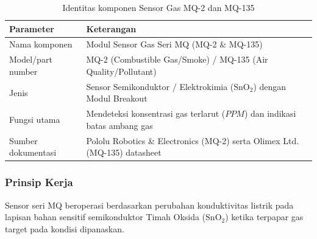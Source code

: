 \begin{table}[H]
	\centering
	\caption{Identitas komponen Sensor Gas MQ-2 dan MQ-135}
	\label{tab:mq_identitas}
	\small
	\begin{tabularx}{\textwidth}{@{}lX@{}}
		\toprule
		Parameter          & Keterangan                                                                 \\
		\midrule
		Nama komponen      & Modul Sensor Gas Seri MQ (MQ-2 \& MQ-135)                                  \\
		Model/part number  & MQ-2 (Combustible Gas/Smoke) / MQ-135 (Air Quality/Pollutant)              \\
		Jenis              & Sensor Semikonduktor / Elektrokimia ($\text{SnO}_2$) dengan Modul Breakout \\
		Fungsi utama       & Mendeteksi konsentrasi gas terlarut ($PPM$) dan indikasi batas ambang gas  \\
		Sumber dokumentasi & Pololu Robotics \& Electronics (MQ-2) serta Olimex Ltd. (MQ-135) datasheet \\
		\bottomrule
	\end{tabularx}
\end{table}

\subsubsection{Prinsip Kerja}
Sensor seri MQ beroperasi berdasarkan perubahan konduktivitas listrik pada lapisan bahan sensitif semikonduktor Timah Oksida ($\text{SnO}_2$) ketika terpapar gas target pada kondisi dipanaskan.

